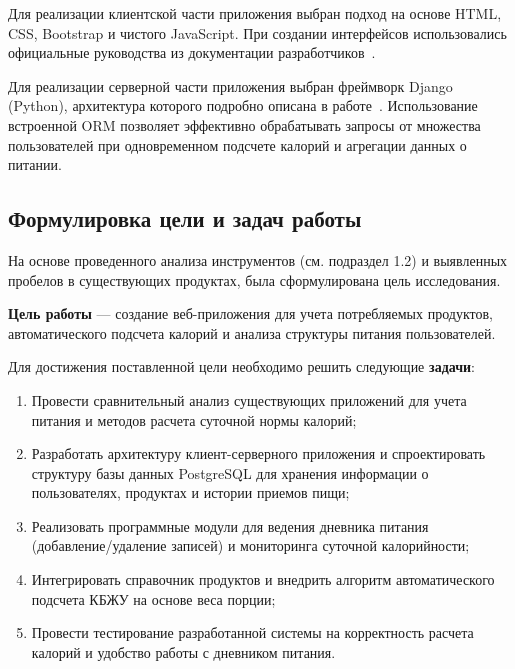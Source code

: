 Для реализации клиентской части приложения выбран подход на основе HTML, CSS, Bootstrap и чистого JavaScript. При создании интерфейсов использовались официальные руководства из документации разработчиков~\cite{bootstrap_docs}.

Для реализации серверной части приложения выбран фреймворк Django (Python), архитектура которого подробно описана в работе~\cite{django_docs}.
Использование встроенной ORM позволяет эффективно обрабатывать запросы от множества пользователей при одновременном подсчете калорий и агрегации данных о питании.

\subsection{Формулировка цели и задач работы}

На основе проведенного анализа инструментов (см. подраздел 1.2) и выявленных
пробелов в существующих продуктах, была сформулирована цель исследования.

\textbf{Цель работы} --- создание веб-приложения для учета потребляемых продуктов, автоматического подсчета калорий и анализа структуры питания пользователей.


Для достижения поставленной цели необходимо решить следующие \textbf{задачи}:
\begin{enumerate}
	\item Провести сравнительный анализ существующих приложений для учета питания и методов расчета суточной нормы калорий;
	\item Разработать архитектуру клиент-серверного приложения и спроектировать структуру базы данных PostgreSQL для хранения информации о пользователях, продуктах и истории приемов пищи;
	\item Реализовать программные модули для ведения дневника питания (добавление/удаление записей) и мониторинга суточной калорийности;
	\item Интегрировать справочник продуктов и внедрить алгоритм автоматического подсчета КБЖУ на основе веса порции;
	\item Провести тестирование разработанной системы на корректность расчета калорий и удобство работы с дневником питания.
\end{enumerate}